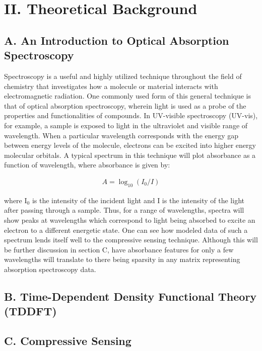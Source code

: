 \documentclass[11pt]{article}
\begin{document}

\section*{II.	Theoretical Background}	%
\subsection*{A.	An Introduction to Optical Absorption Spectroscopy} %

Spectroscopy is a useful and highly utilized technique throughout the field of chemistry that investigates how a molecule or material interacts with electromagnetic radiation. One commonly used form of this general technique is that of optical absorption spectroscopy, wherein light is used as a probe of the properties and functionalities of compounds. In UV-visible spectroscopy (UV-vis), for example, a sample is exposed to light in the ultraviolet and visible range of wavelength. When a particular wavelength corresponds with the energy gap between energy levels of the molecule, electrons can be excited into higher energy molecular orbitals. A typical spectrum in this technique will plot absorbance as a function of wavelength, where absorbance is given by:

\begin{align*}
A = \log_{10}{(I_0/I)}
\end{align*}

where I$_0$ is the intensity of the incident light and I is the intensity of the light after passing through a sample. Thus, for a range of wavelengths, spectra will show peaks at wavelengths which correspond to light being absorbed to excite an electron to a different energetic state. One can see how modeled data of such a spectrum lends itself well to the compressive sensing technique. Although this will be further discussion in section C, have absorbance features for only a few wavelengths will translate to there being sparsity in any matrix representing absorption spectroscopy data. 

\subsection*{B.	Time-Dependent Density Functional Theory (TDDFT)} %

\subsection*{C.	Compressive Sensing}	%
\end{document}
